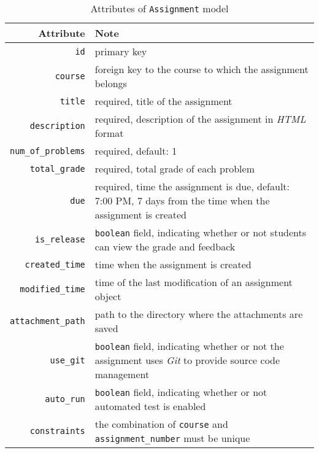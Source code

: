 \begin{table}[ht]
    \centering
    \caption{Attributes of \texttt{Assignment} model}
    \label{tab:ASM_ATTR}
    \renewcommand{\arraystretch}{1.3}
    \begin{tabular}[ht]{r|p{4in}}
        \hline
        Attribute & Note \\
        \hline
        \hline

        \texttt{id} & primary key \\
        \hline
        \texttt{course} & foreign key to the course to which the assignment
            belongs \\
        \hline
        \hline

        \texttt{title} & required, title of the assignment\\
        \hline
        \texttt{description} & required, description of the assignment 
            in \emph{HTML} format \\
        \hline
        \texttt{num\_of\_problems} & required, default: 1 \\
        \hline
        \texttt{total\_grade} & required, total grade of each problem \\
        \hline
        \texttt{due} & required, time the assignment is due, default: 7:00 PM, 7
            days  from the time when the assignment is created \\
        \hline
        \texttt{is\_release} & \texttt{boolean} field, indicating whether or not
            students can view the grade and feedback \\
        \hline
        \texttt{created\_time} & time when the assignment is created \\
        \hline
        \texttt{modified\_time} & time of the last modification of an assignment
            object\\
        \hline
        \texttt{attachment\_path} & path to the directory where the attachments
            are saved \\
        \hline
        \hline

        \texttt{use\_git} & \texttt{boolean} field, indicating whether or not
            the  assignment uses \emph{Git} to provide source code management \\
        \hline
        \texttt{auto\_run} & \texttt{boolean} field, indicating whether or not
            automated test  is enabled \\
        \hline
        \hline

        \texttt{constraints} & the combination of \texttt{course} and \texttt{assignment\_number}
            must  be unique \\
        \hline
    \end{tabular}
    \renewcommand{\arraystretch}{1}
\end{table}

